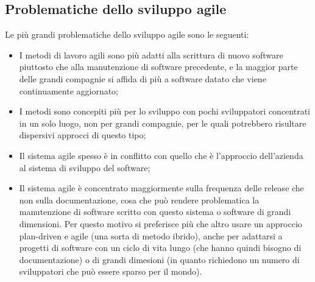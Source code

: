 \documentclass[a4paper, 10pt]{article}
\begin{document}
		\subsection*{Problematiche dello sviluppo agile}
		Le più grandi problematiche dello sviluppo agile sono le seguenti:
		\begin{itemize}
			\item I metodi di lavoro agili sono più adatti alla scrittura di nuovo software piuttosto che alla manutenzione di software precedente, e la maggior parte delle grandi compagnie si affida di più a software datato che viene continuamente aggiornato;
			
			\item I metodi sono concepiti più per lo sviluppo con pochi sviluppatori concentrati in un solo luogo, non per grandi compagnie, per le quali potrebbero risultare dispersivi approcci di questo tipo;
			
			\item Il sistema agile spesso è in conflitto con quello che è l'approccio dell'azienda al sistema di sviluppo del software;
			
			\item Il sistema agile è concentrato maggiormente sulla frequenza delle release che non sulla documentazione, cosa che può rendere problematica la manutenzione di software scritto con questo sistema o software di grandi dimensioni. Per questo motivo si preferisce più che altro usare un approccio plan-driven e agile (una sorta di metodo ibrido), anche per adattarsi a progetti di software con un ciclo di vita lungo (che hanno quindi bisogno di documentazione) o di grandi dimesioni (in quanto richiedono un numero di sviluppatori che può essere sparso per il mondo).
		\end{itemize}
		
	
	
	
\end{document}

